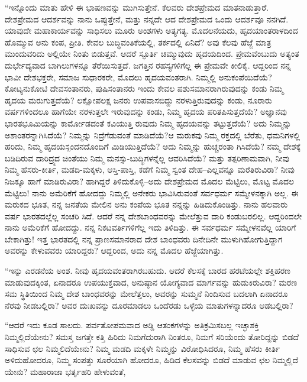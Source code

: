 “ಇನ್ನೊಂದು ಮಾತು ಹೇಳಿ ಈ ಭಾಷಣವನ್ನು ಮುಗಿಸುತ್ತೇನೆ. ಕೆಲವರು ದೇಶಪ್ರೇಮದ ಮಾತನಾಡುತ್ತಾರೆ. ದೇಶಪ್ರೇಮದ ಆದರ್ಶವನ್ನು ನಾನು ಒಪ್ಪುತ್ತೇನೆ, ಮತ್ತು ನನ್ನದೇ ಆದ ದೇಶಪ್ರೇಮದ ಒಂದು ಆದರ್ಶವೂ ನನಗಿದೆ. ಯಾವುದೇ ಮಹಾಕಾರ್ಯವನ್ನು ಸಾಧಿಸಲು ಮೂರು ಅಂಶಗಳು ಅತ್ಯಗತ್ಯ. ಮೊದಲನೆಯದು, ಹೃದಯಾಂತರಾಳದಿಂದ ಹೊಮ್ಮುವ ಅನು ಕಂಪ, ಪ್ರೀತಿ. ಕೇವಲ ಬುದ್ಧಿವಂತಿಕೆಯಲ್ಲಿ, ತರ್ಕದಲ್ಲಿ ಏನಿದೆ? ಅವು ಕೆಲವು ಹೆಜ್ಜೆ ಮಾತ್ರ ಮುಂದುವರಿದು ಅಲ್ಲಿಯೇ ನಿಂತು ಬಿಡುತ್ತವೆ. ಆದರೆ ಸ್ಫೂರ್ತಿ ಚಿಮ್ಮುವುದು ಹೃದಯದಿಂದ. ಪ್ರೇಮವೆಂಬುದು ಅತ್ಯಂತ ದುರ್ಭೇದ್ಯವಾದ ಬಾಗಿಲುಗಳನ್ನೂ ತೆರೆಯಿಸುತ್ತದೆ. ಜಗತ್ತಿನ ರಹಸ್ಯಗಳಿಗೆಲ್ಲ ಈ ಪ್ರೇಮವೇ ಕೀಲಿಕೈ. ಆದ್ದರಿಂದ ನನ್ನ ಭಾವೀ ದೇಶಭಕ್ತರೇ, ಸಮಾಜ ಸುಧಾರಕರೇ, ಮೊದಲು ಹೃದಯವಂತರಾಗಿ. ನಿಮ್ಮಲ್ಲಿ ಅನುಕಂಪೆಯಿದೆಯೆ? ಕೋಟ್ಯನುಕೋಟಿ ದೇವಸಂತಾನರು, ಪುಷಿಸಂತಾನರು ಇಂದು ಕೇವಲ ಪಶುಸಮಾನರಾಗಿರುವುದನ್ನು ಕಂಡು ನಿಮ್ಮ ಹೃದಯ ಮರುಗುತ್ತದೆಯೆ? ಲಕ್ಷೋಪಲಕ್ಷ ಜನರು ಉಪವಾಸಬಿದ್ದು ನರಳುತ್ತಿರುವುದನ್ನು ಕಂಡು, ನೂರಾರು ವರ್ಷಗಳಿಂದಲೂ ಹಾಗೆಯೇ ನರಳುತ್ತಲೇ ಇರುವುದನ್ನು ಕಂಡು, ನಿಮ್ಮ ಹೃದಯ ಪರಿತಪಿಸುತ್ತದೆಯೆ? ಅಜ್ಞಾನವು ಭಾರತಭೂಮಿಯನ್ನು ಕಾರ್ಮೋಡದಂತೆ ಕವಿಯುತ್ತಿ ರುವುದು ನಿಮ್ಮ ಹೃದಯವನ್ನು ತಟ್ಟುತ್ತದೆಯೆ? ಅದು ನಿಮ್ಮನ್ನು ಅಶಾಂತರನ್ನಾಗಿಸಿದೆಯೆ? ನಿಮ್ಮನ್ನು ನಿದ್ರೆಗೆಡುವಂತೆ ಮಾಡಿದೆಯೆ?ಆ ಮರುಕವು ನಿಮ್ಮ ರಕ್ತದಲ್ಲಿ ಬೆರೆತು, ಧಮನಿಗಳಲ್ಲಿ ಹರಿದು, ನಿಮ್ಮ ಹೃದಯಸ್ಪಂದನದೊಂದಿಗೆ ಮಿಡಿಯುತ್ತಿದೆಯೆ? ಅದು ನಿಮ್ಮನ್ನು ಹುಚ್ಚರಂತಾ ಗಿಸಿದೆಯೆ? ನಮ್ಮ ದೇಶಕ್ಕೆ ಬಡಿದಿರುವ ದಾರಿದ್ರ್ಯದ ಚಿಂತೆಯು ನಿಮ್ಮ ಮನಸ್ಸು-ಬುದ್ಧಿಗಳನ್ನೆಲ್ಲ ಆವರಿಸಿದೆಯೆ? ಮತ್ತು ತತ್ಪರಿಣಾಮವಾಗಿ, ನೀವು ನಿಮ್ಮ ಹೆಸರು-ಕೀರ್ತಿ, ಮಡದಿ-ಮಕ್ಕಳು, ಆಸ್ತಿ-ಪಾಸ್ತಿ, ಕಡೆಗೆ ನಿಮ್ಮ ಸ್ವಂತ ದೇಹ–ಎಲ್ಲವನ್ನೂ ಮರೆತಿರುವಿರಾ? ನೀವು ನಿಜಕ್ಕೂ ಹಾಗೆ ಮಾಡಿರುವಿರಾ? ಹಾಗಿದ್ದರೆ ತಿಳಿದುಕೊಳ್ಳಿ–ಅದು ದೇಶಪ್ರೇಮದ ಮೊದಲ ಮೆಟ್ಟಿಲು, ಮೊಟ್ಟ ಮೊದಲ ಮೆಟ್ಟಿಲು! ನಾನು ಅಮೆರಿಕೆಗೆ ಹೋದದ್ದು ನಿಮ್ಮಲ್ಲಿ ಅನೇಕರು ಭಾವಿಸಿರುವಂತೆ ಸರ್ವಧರ್ಮ ಸಮ್ಮೇಳನಕ್ಕಾಗಿ ಅಲ್ಲ. ಈ ಮರುಕದ ಭೂತ, ನನ್ನ ಜನತೆಯ ಮೇಲಿನ ಅನು ಕಂಪೆಯ ಭೂತ ನನ್ನನ್ನು ಹಿಡಿದುಕೊಂಡಿತ್ತು. ನಾನು ಹಲವಾರು ವರ್ಷ ಭಾರತದಲ್ಲೆಲ್ಲ ಸಂಚರಿ ಸಿದೆ. ಆದರೆ ನನ್ನ ದೇಶಬಾಂಧವರನ್ನು ಮೇಲೆತ್ತುವ ದಾರಿ ಕಂಡುಬರಲಿಲ್ಲ. ಆದ್ದರಿಂದಲೇ ನಾನು ಅಮೆರಿಕೆಗೆ ಹೋದದ್ದು. ನನ್ನ ನಿಕಟವರ್ತಿಗಳಿಗೆಲ್ಲ ಇದು ತಿಳಿದಿತ್ತು. ಈ ಸರ್ವಧರ್ಮ ಸಮ್ಮೇಳನವೆಲ್ಲ ಯಾರಿಗೆ ಬೇಕಾಗಿತ್ತು! ಇತ್ತ ಭಾರತದಲ್ಲಿ ನನ್ನ ಪ್ರಾಣಸಮಾನರಾದ ದೇಶ ಬಾಂಧವರು ದಿನೇದಿನೇ ಮುಳುಗಿಹೋಗುತ್ತಿದ್ದಾಗ ಅವರನ್ನು ಕೇಳುವವರು ಯಾರಿದ್ದರು? ಆದ್ದರಿಂದ, ಅದು ನನ್ನ ಮೊದಲ ಹೆಜ್ಜೆಯಾಗಿತ್ತು.

“ಇನ್ನು ಎರಡನೆಯ ಅಂಶ. ನೀವು ಹೃದಯವಂತರಾಗಿರಬಹುದು. ಆದರೆ ಕೆಲಸಕ್ಕೆ ಬಾರದ ಹರಟೆಯಲ್ಲೇ ಶಕ್ತಿಹರಣ ಮಾಡುವುದಕ್ಕಿಂತ, ಏನಾದರೂ ಉಪಯುಕ್ತವಾದ, ಅನುಷ್ಠಾನ ಯೋಗ್ಯವಾದ ಮಾರ್ಗವನ್ನು ಹುಡುಕಿರುವಿರಾ? ಮರಣ ಸಮ ಸ್ಥಿತಿಯಿಂದ ನಿಮ್ಮ ದೇಶ ಬಾಂಧವರನ್ನು ಮೇಲೆತ್ತಲು, ಅವರನ್ನು ಸುಮ್ಮನೆ ನಿಂದಿಸುವ ಬದಲಾಗಿ ಏನಾದರೂ ನೆರವು ನೀಡಬಲ್ಲಿರಾ? ಅವರ ದುಃಖವನ್ನು ದೂರಮಾಡಲು ಒಂದೆರಡು ಒಳ್ಳೆಯ ಮಾತುಗಳನ್ನಾದರೂ ಆಡಬಲ್ಲಿರಾ?

“ಆದರೆ ಇದು ಕೂಡ ಸಾಲದು. ಪರ್ವತೋಪಮವಾದ ಅಡ್ಡಿ ಆತಂಕಗಳನ್ನು ಅತಿಕ್ರಮಿಸಬಲ್ಲ ಇಚ್ಛಾಶಕ್ತಿ ನಿಮ್ಮಲ್ಲಿದೆಯೇನು? ಸಮಸ್ತ ಜಗತ್ತೇ ಕತ್ತಿ ಹಿರಿದು ನಿಮಗೆದುರಾಗಿ ನಿಂತರೂ, ನಿಮಗೆ ಸರಿಯೆಂದು ತೋರಿದ್ದನ್ನು ಬಿಡದೆ ಸಾಧಿಸುವ ಛಲ ನಿಮ್ಮಲಿದೆಯೇನು? ನಿಮ್ಮ ಮಡದಿ ಮಕ್ಕಳೇ ನಿಮ್ಮನ್ನು ವಿರೋಧಿಸಿದರೂ, ನಿಮ್ಮ ಹೆಸರು ಕೀರ್ತಿ ಅಳಿದುಹೋದರೂ, ನಿಮ್ಮ ಸಂಪತ್ತು ಸೂರೆಯಾಗಿ ಹೋದರೂ, ಹಿಡಿದ ಕೆಲಸವನ್ನು ಬಿಡದೆ ಮಾಡುವ ಛಲ ನಿಮ್ಮಲ್ಲಿದೆ ಯೇನು? ಮಹಾರಾಜಾ ಭರ್ತೃಹರಿ ಹೇಳುವಂತೆ,

